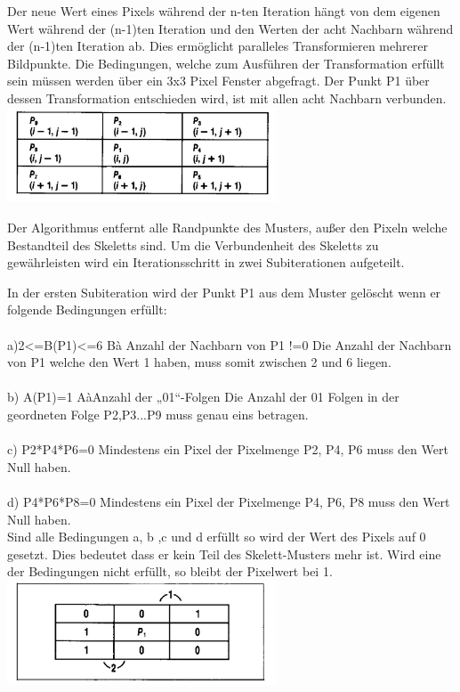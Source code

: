 Der neue Wert eines Pixels während der n-ten Iteration hängt von dem eigenen Wert während der (n-1)ten Iteration und den Werten der acht Nachbarn während der (n-1)ten Iteration ab. Dies ermöglicht paralleles Transformieren mehrerer Bildpunkte. 
Die Bedingungen, welche zum Ausführen der Transformation erfüllt sein müssen werden über ein 3x3 Pixel Fenster abgefragt. Der Punkt P1 über dessen Transformation entschieden wird, ist mit allen acht Nachbarn verbunden.\\

\includegraphics[width=8cm]{Res/PixelNachbarschaft.png}


Der Algorithmus entfernt alle Randpunkte des Musters, außer den Pixeln welche Bestandteil des Skeletts sind. Um die Verbundenheit des Skeletts zu gewährleisten wird ein  Iterationsschritt in zwei Subiterationen aufgeteilt.

In der ersten Subiteration wird der Punkt P1 aus dem Muster gelöscht wenn er folgende Bedingungen erfüllt:\\ \\
a)2<=B(P1)<=6     
Bà Anzahl der Nachbarn von P1 !=0
Die Anzahl der Nachbarn von P1 welche den Wert 1 haben, muss somit zwischen 2 und 6 liegen.\\ \\
b) A(P1)=1
AàAnzahl der „01“-Folgen 
Die Anzahl der 01 Folgen in der geordneten Folge P2,P3...P9 muss genau eins betragen.\\ \\
c) P2*P4*P6=0  
Mindestens ein Pixel der Pixelmenge P2, P4, P6 muss den Wert Null haben.\\ \\
d) P4*P6*P8=0
Mindestens ein Pixel der Pixelmenge P4, P6, P8 muss den Wert Null haben.
\\

Sind alle Bedingungen a, b ,c und d erfüllt so wird der Wert des Pixels auf 0 gesetzt.
Dies bedeutet dass er kein Teil des Skelett-Musters mehr ist.
Wird eine der Bedingungen nicht erfüllt, so bleibt der Pixelwert bei 1.\\

\includegraphics[width=8cm]{Res/01Folgen.png}


